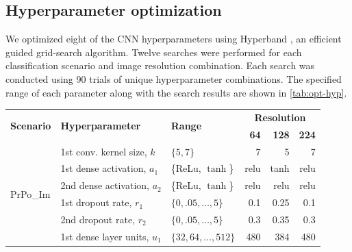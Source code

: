 \documentclass[Journal,letterpaper, SingleSpace, InsideFigs]{ascelike-new}
\begin{document}
\subsection{Hyperparameter optimization}
We optimized eight of the CNN hyperparameters using Hyperband \cite{li2018hyperband}, an efficient guided grid-search algorithm.
Twelve searches were performed for each classification scenario and image resolution combination.
Each search was conducted using 90 trials of unique hyperparameter combinations. The specified range of each parameter along with the search results are shown in \autoref{tab:opt-hyp}.
\begin{table}[ht!]\small
    \centering
\begin{tabular}{@{}lllrrr@{}}
\toprule
\multirow{2}{*}{\textbf{Scenario}} & \multirow{2}{*}{\textbf{Hyperparameter}} & \multirow{2}{*}{\textbf{Range}} & \multicolumn{3}{c}{\textbf{Resolution}} \\ \cmidrule(l){4-6} 
                          &                              &                           & \textbf{64}             & \textbf{128}            & \textbf{224}            \\ \midrule
\multirow{8}{*}{PrPo\_Im}  & 1st conv. kernel size, $k$   & $\{5, 7\}$                & 7                       & 5                       & 7                       \\
                          & 1st dense activation, $a_1$  & \{ReLu, $\tanh$\}         & relu                    & tanh                    & relu                    \\
                          & 2nd dense activation, $a_2$  & \{ReLu, $\tanh$\}         & relu                    & relu                    & relu                    \\
                          & 1st dropout rate, $r_1$      & $\{0, .05, \ldots, 5\}$   & 0.1                     & 0.25                    & 0.1                     \\
                          & 2nd dropout rate, $r_2$      & $\{0, .05, \ldots, 5\}$   & 0.3                     & 0.35                    & 0.3                     \\
                          & 1st dense layer units, $u_1$ & $\{32, 64, \ldots, 512\}$ & 480                     & 384                     & 480                     \\

\end{tabular}
\end{table}
\end{document}
